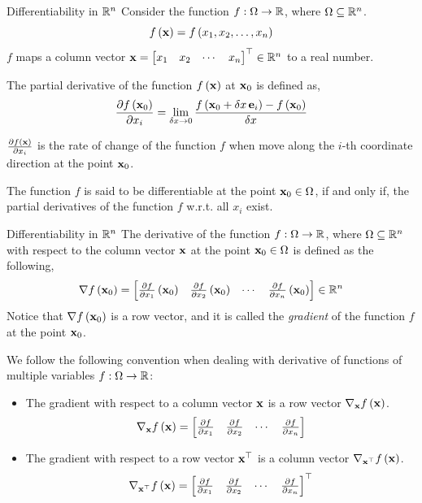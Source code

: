 \documentclass[aspectratio=169]{beamer}
\let\olditem\item
\renewcommand{\item}{\setlength{\itemsep}{\fill}\olditem}
\def\mf{\ensuremath\mathbf}
\def\mb{\ensuremath\mathbb}
\def\lp{\ensuremath\left(}
\def\rp{\ensuremath\right)}
\def\bmx{\ensuremath\begin{bmatrix*}[r]}
\def\emx{\ensuremath\end{bmatrix*}}
\def\R{\ensuremath\mb{R}}
\newcommand{\ct}[1]{\lp #1\rp}
\begin{document}
\begin{frame}[t]{Differentiability in $\R^n$}
  Consider the function $f: \Omega \to \R$, where $\Omega \subseteq \R^n$.
  \[ f\ct{\mf{x}} = f\ct{x_1, x_2, \ldots, x_n} \]
  $f$ maps a column vector $\mf{x} = \bmx x_1 & x_2 & \cdots & x_n \emx^\top \in \mb{R}^n$ to a real number.
  \vspace{0.25cm}

  The partial derivative of the function $f\ct{\mf{x}}$ at $\mf{x}_0$ is defined as,
  \[ \frac{\partial f\ct{\mf{x}_0}}{\partial x_i} = \lim_{\delta x \to 0} \frac{f\ct{\mf{x}_0 + \delta x \, \mf{e}_i} - f\ct{\mf{x}_0}}{\delta x} \]

  $\frac{\partial f\ct{\mf{x}}}{\partial x_i}$ is the rate of change of the function $f$ when move along the $i$-th coordinate direction at the point $\mf{x}_0$.
  \vspace{0.25cm}
  
  The function $f$ is said to be differentiable at the point $\mf{x}_0 \in \Omega$, if and only if, the partial derivatives of the function $f$ w.r.t. all $x_i$ exist.
\end{frame}


\begin{frame}[t]{Differentiability in $\R^n$}
  The derivative of the function $f: \Omega \to \R$, where $\Omega \subseteq \R^n$ with respect to the column vector $\mf{x}$ at the point $\mf{x}_0 \in \Omega$ is defined as the following,
  \[ \nabla f\ct{\mf{x}_0} = \bmx \frac{\partial f}{\partial x_1}\ct{\mf{x}_0} & \frac{\partial f}{\partial x_2}\ct{\mf{x}_0} & \cdots & \frac{\partial f}{\partial x_n}\ct{\mf{x}_0}\emx \in \mb{R}^n \]
  Notice that $\nabla f\ct{\mf{x}_0}$ is a row vector, and it is called the \textit{gradient} of the function $f$ at the point $\mf{x}_0$.

  We follow the following convention when dealing with derivative of functions of multiple variables $f: \Omega \to \R$:
  \begin{itemize}
    \item The gradient with respect to a column vector $\mf{x}$ is a row vector $\nabla_{\mf{x}} f\ct{\mf{x}}$.
    \[ \nabla_{\mf{x}} f\ct{\mf{x}} = \bmx \frac{\partial f}{\partial x_1} & \frac{\partial f}{\partial x_2} & \cdots & \frac{\partial f}{\partial x_n} \emx \]
    \item The gradient with respect to a row vector $\mf{x}^\top$ is a column vector $\nabla_{\mf{x}^\top} f\ct{\mf{x}}$.
    \[ \nabla_{\mf{x}^\top} f\ct{\mf{x}} = \bmx \frac{\partial f}{\partial x_1} & \frac{\partial f}{\partial x_2} & \cdots & \frac{\partial f}{\partial x_n} \emx^\top \]
  \end{itemize}
\end{frame}
\end{document}

